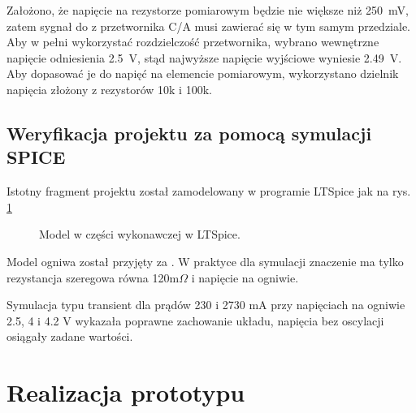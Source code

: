 \documentclass[polish,engineer]{polsl-msth}
\begin{document}
Założono, że napięcie na rezystorze pomiarowym będzie nie większe niż 250~mV, zatem sygnał do z przetwornika C/A musi zawierać się w tym samym przedziale. Aby w pełni wykorzystać rozdzielczość przetwornika, wybrano wewnętrzne napięcie odniesienia 2.5~V, stąd najwyższe napięcie wyjściowe wyniesie 2.49~V. Aby dopasować je do napięć na elemencie pomiarowym, wykorzystano dzielnik napięcia złożony z rezystorów 10k i 100k.
\section{Weryfikacja projektu za pomocą symulacji SPICE}
Istotny fragment projektu został zamodelowany w programie LTSpice jak na rys. \ref{img:modelLTv1}
\begin{figure}[hbtp]
\centering
     \caption{Model w części wykonawczej w LTSpice. \label{img:modelLTv1}}
\end{figure}
Model ogniwa został przyjęty za \cite{8759769_cellmodel1storder}. W praktyce dla symulacji znaczenie ma tylko rezystancja szeregowa równa 120m$\Omega$ i napięcie na ogniwie.

Symulacja typu transient dla prądów 230 i 2730 mA przy napięciach na ogniwie 2.5, 4 i 4.2 V wykazała poprawne zachowanie układu, napięcia bez oscylacji osiągały zadane wartości.

\chapter{Realizacja prototypu}
\end{document}
